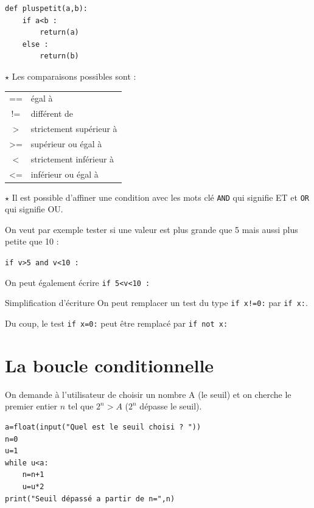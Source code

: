 \begin{lstlisting}
def pluspetit(a,b):
    if a<b :
        return(a)
    else :
        return(b)
\end{lstlisting}

\begin{Rmq}[s]
$\star$ Les comparaisons possibles sont  :

\begin{center}
\begin{tabular}{c@{\hspace*{1em}:\hspace*{1em}}l}
== &égal à\\
!= &différent de\\
>  &strictement supérieur à \\
>= &supérieur ou égal à\\
<  &strictement inférieur à\\
<= &inférieur ou égal à
\end{tabular}
\end{center}

$\star$  Il est possible d'affiner une condition avec les mots clé \verb!AND! qui signifie \og ET\fg{} et \verb!OR! qui signifie \og OU\fg{}.

On veut par exemple tester si une valeur est plus grande que 5 mais aussi plus petite que 10 : 

\verb!if v>5 and v<10 :!

On peut également écrire \verb~if 5<v<10 :~
\end{Rmq}

\medskip

\begin{CadreAlgo}{\linewidth}{Simplification d'écriture}
On peut remplacer un test du type 
\verb~if x!=0:~
par \verb!if x:!.

Du coup, le test \verb!if x=0:! peut être remplacé par 
\verb!if not x:!
\end{CadreAlgo}

\section{La boucle conditionnelle}

On demande à l'utilisateur de choisir un nombre A (le seuil) et on cherche le premier entier $n$ tel que $2^n>A$ ($2^n$ dépasse le seuil).


\begin{lstlisting}
a=float(input("Quel est le seuil choisi ? "))
n=0
u=1
while u<a:
    n=n+1
    u=u*2
print("Seuil dépassé a partir de n=",n)
\end{lstlisting}




